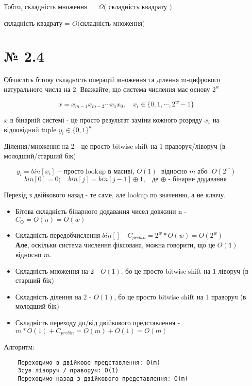 \documentclass[11pt, a4paper]{article} %
\begin{document}
Тобто, складність множення $= \Omega($ складність квадрату $)$

складність квадрату = $O($складність множення$)$ \qedsymbol


\section*{№ 2.4}
\begin{mdframed}
    Обчислiть бiтову складнiсть операцiй множення та дiлення m-цифрового натурального числа на 2. 
    Вважайте, що система числення має основу $2^w$
\end{mdframed}

$$x = x_{m-1}x_{m-2}\cdots x_1 x_0, \quad x_i \in \{0,1,\cdots , 2^w - 1\}$$

$x$ в бінарній системі - це просто результат заміни кожного розряду $x_i$ 
на відповідний tuple $y_i \in \{0,1\}^w$

Ділення/множення на 2 - це просто bitwise shift на 1 праворуч/ліворуч (в молодший/старший бік)

$$y_i = bin[x_i] - \text{просто lookup в масиві, } O(1) \;\text{ відносно $m$ або }\; O(2^w)$$
$$bin[0] = 0; \quad bin[j] = bin[j-1] \oplus 1, \; \text{ де $\oplus$ - бінарне додавання}$$

Перехід з двійкового назад - те саме, але lookup по значенню, а не ключу.

\begin{itemize}
\item 
Бітова складність бінарного додавання чисел довжини n - $C_\oplus = O(n) = O(w)$

\item 
Складність передобчислення $bin[]$ - $C_{pre bin} = 2^w * O(w) = O(2^w)$\\
\textbf{Але}, оскільки система числення фіксована, можна говорити, що це $O(1)$ відносно $m$. 

\item 
Складність множення на 2 - $O(1)$, бо це просто bitwise shift на 1 ліворуч (в старший бік)

\item 
Складність ділення на 2 - $O(1)$, бо це просто bitwise shift на 1 праворуч (в молодший бік)

\item
Складність переходу до/від двійкового представлення - $m*O(1) + C_{pre bin} = O(m) + O(1) = O(m)$
\end{itemize}

Алгоритм:
\begin{lstlisting}
    Переходимо в двійкове представлення: O(m)
    Зсув ліворуч / праворуч: O(1)
    Переходимо назад з двійкового представлення: O(m)
\end{lstlisting}
\end{document}
